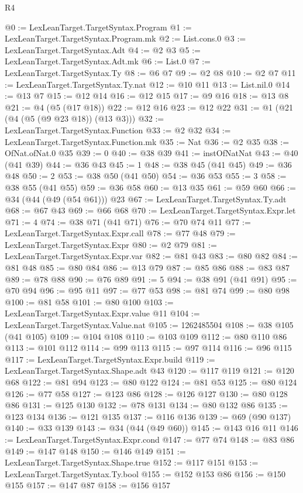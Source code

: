 \begin{lexlean}{R4}
\begin{coremodule}
@0 := LexLeanTarget.TargetSyntax.Program
@1 := LexLeanTarget.TargetSyntax.Program.mk
@2 := List.cons.{0}
@3 := LexLeanTarget.TargetSyntax.Adt
@4 := @2 @3
@5 := LexLeanTarget.TargetSyntax.Adt.mk
@6 := List.{0}
@7 := LexLeanTarget.TargetSyntax.Ty
@8 := @6 @7
@9 := @2 @8
@10 := @2 @7
@11 := LexLeanTarget.TargetSyntax.Ty.nat
@12 := @10 @11
@13 := List.nil.{0}
@14 := @13 @7
@15 := @12 @14
@16 := @12 @15
@17 := @9 @16
@18 := @13 @8
@21 := @4 (@5 (@17 @18))
@22 := @12 @16
@23 := @12 @22
@31 := @1 (@21 (@4 (@5 (@9 @23 @18)) (@13 @3)))
@32 := LexLeanTarget.TargetSyntax.Function
@33 := @2 @32
@34 := LexLeanTarget.TargetSyntax.Function.mk
@35 := Nat
@36 := @2 @35
@38 := OfNat.ofNat.{0} @35
@39 := 0
@40 := @38 @39
@41 := instOfNatNat
@43 := @40 (@41 @39)
@44 := @36 @43
@45 := 1
@48 := @38 @45 (@41 @45)
@49 := @36 @48
@50 := 2
@53 := @38 @50 (@41 @50)
@54 := @36 @53
@55 := 3
@58 := @38 @55 (@41 @55)
@59 := @36 @58
@60 := @13 @35
@61 := @59 @60
@66 := @34 (@44 (@49 (@54 @61))) @23
@67 := LexLeanTarget.TargetSyntax.Ty.adt
@68 := @67 @43
@69 := @66 @68
@70 := LexLeanTarget.TargetSyntax.Expr.let
@71 := 4
@74 := @38 @71 (@41 @71)
@76 := @70 @74 @11
@77 := LexLeanTarget.TargetSyntax.Expr.call
@78 := @77 @48
@79 := LexLeanTarget.TargetSyntax.Expr
@80 := @2 @79
@81 := LexLeanTarget.TargetSyntax.Expr.var
@82 := @81 @43
@83 := @80 @82
@84 := @81 @48
@85 := @80 @84
@86 := @13 @79
@87 := @85 @86
@88 := @83 @87
@89 := @78 @88
@90 := @76 @89
@91 := 5
@94 := @38 @91 (@41 @91)
@95 := @70 @94
@96 := @95 @11
@97 := @77 @53
@98 := @81 @74
@99 := @80 @98
@100 := @81 @58
@101 := @80 @100
@103 := LexLeanTarget.TargetSyntax.Expr.value @11
@104 := LexLeanTarget.TargetSyntax.Value.nat
@105 := 1262485504
@108 := @38 @105 (@41 @105)
@109 := @104 @108
@110 := @103 @109
@112 := @80 @110 @86
@113 := @101 @112
@114 := @99 @113
@115 := @97 @114
@116 := @96 @115
@117 := LexLeanTarget.TargetSyntax.Expr.build
@119 := LexLeanTarget.TargetSyntax.Shape.adt @43
@120 := @117 @119
@121 := @120 @68
@122 := @81 @94
@123 := @80 @122
@124 := @81 @53
@125 := @80 @124
@126 := @77 @58
@127 := @123 @86
@128 := @126 @127
@130 := @80 @128 @86
@131 := @125 @130
@132 := @78 @131
@134 := @80 @132 @86
@135 := @123 @134
@136 := @121 @135
@137 := @116 @136
@139 := @69 (@90 @137)
@140 := @33 @139
@143 := @34 (@44 (@49 @60))
@145 := @143 @16 @11
@146 := LexLeanTarget.TargetSyntax.Expr.cond
@147 := @77 @74
@148 := @83 @86
@149 := @147 @148
@150 := @146 @149
@151 := LexLeanTarget.TargetSyntax.Shape.true
@152 := @117 @151
@153 := LexLeanTarget.TargetSyntax.Ty.bool
@155 := @152 @153 @86
@156 := @150 @155
@157 := @147 @87
@158 := @156 @157

\end{coremodule}
\end{lexlean}
